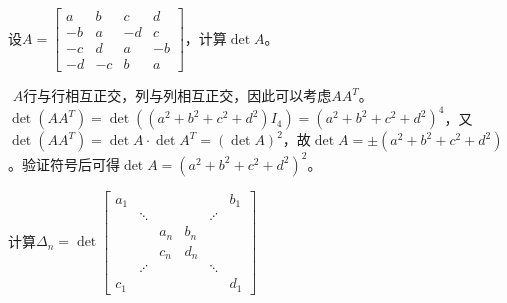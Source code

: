                 \begin{example}
                    设$A=\begin{bmatrix}a&b&c&d\\-b&a&-d&c\\-c&d&a&-b\\-d&-c&b&a\end{bmatrix}$，计算$\det A$。
                \end{example}

                \begin{solution}
                    \,\,$A$行与行相互正交，列与列相互正交，因此可以考虑$AA^T$。$\det(AA^T)=\det((a^2+b^2+c^2+d^2)I_4)=(a^2+b^2+c^2+d^2)^4$，又$\det(AA^T)=\det A\cdot\det A^T=(\det A)^2$，故$\det A=\pm(a^2+b^2+c^2+d^2)$。验证符号后可得$\det A=(a^2+b^2+c^2+d^2)^2$。
                \end{solution}

                \begin{example}
                    \label{determinant_example2}
                    计算$\Delta_n=\det\begin{bmatrix}a_1&&&&&b_1\\&\ddots&&& \iddots\\&&a_n&b_n\\&&c_n&d_n\\&\iddots&&&\ddots\\c_1&&&&&d_1\end{bmatrix}$
                \end{example}

